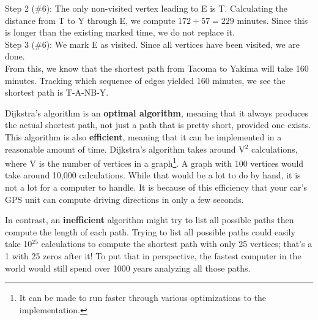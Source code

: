 \begin{example}{}
\noindent Step 2 (\#6):  The only non-visited vertex leading to E is T.  Calculating the distance from T to Y through E, we compute $172+57 = 229$ minutes.  Since this is longer than the existing marked time, we do not replace it.  \\

\noindent Step 3 (\#6):  We mark E as visited.  Since all vertices have been visited, we are done.  \\

From this, we know that the shortest path from Tacoma to Yakima will take 160 minutes.  Tracking which sequence of edges yielded 160 minutes, we see the shortest path is T-A-NB-Y.
\end{example}

Dijkstra's algorithm is an \textbf{optimal algorithm}, meaning that it always produces the actual shortest path, not just a path that is pretty short, provided one exists.  This algorithm is also \textbf{efficient}, meaning that it can be implemented in a reasonable amount of time.  Dijkstra's algorithm takes around V$^2$ calculations, where V is the number of vertices in a graph\footnote{It can be made to run faster through various optimizations to the implementation.}.  A graph with 100 vertices would take around 10,000 calculations.  While that would be a lot to do by hand, it is not a lot for a computer to handle.  It is because of this efficiency that your car's GPS unit can compute driving directions in only a few seconds.  
 
In contrast, an \textbf{inefficient} algorithm might try to list all possible paths then compute the length of each path.  Trying to list all possible paths could easily take 10$^{25}$ calculations to compute the shortest path with only 25 vertices; that's a 1 with 25 zeros after it!  To put that in perspective, the fastest computer in the world would still spend over 1000 years analyzing all those paths.

